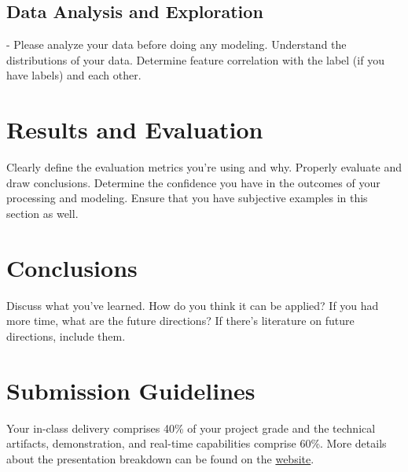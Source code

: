 \documentclass[paper=a4, fontsize=11pt]{scrartcl} %
\begin{document}
\subsection{Data Analysis and Exploration} - Please analyze your data before doing any modeling. Understand the distributions of your data. Determine feature correlation with the label (if you have labels) and each other. \\

\section{Results and Evaluation}

Clearly define the evaluation metrics you're using and why. Properly evaluate and draw conclusions. Determine the confidence you have in the outcomes of your processing and modeling. Ensure that you have subjective examples in this section as well.

\section{Conclusions}

Discuss what you've learned. How do you think it can be applied? If you had more time, what are the future directions? If there's literature on future directions, include them.

\section{Submission Guidelines}

Your in-class delivery comprises 40\% of your project grade and the technical artifacts, demonstration, and real-time capabilities comprise 60\%. More details about the presentation breakdown can be found on the \href{https://course.ccs.neu.edu/cs6120s25/presentation-and-project/}{website}. 
\end{document}
